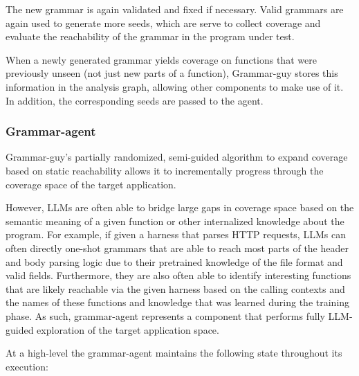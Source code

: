 The new grammar is again validated and fixed if necessary. Valid grammars are again used to generate more seeds, which are serve to collect coverage and evaluate the reachability of the grammar in the program under test.

When a newly generated grammar yields coverage on functions that were previously unseen (not just new parts of a function), Grammar-guy stores this information in the analysis graph, allowing other components to make use of it.
In addition, the corresponding seeds are passed to the \seedsync agent.

\subsubsection{Grammar-agent}

Grammar-guy's partially randomized, semi-guided algorithm to expand coverage based on static reachability allows it to incrementally progress through the coverage space of the target application.

However, LLMs are often able to bridge large gaps in coverage space based on the semantic meaning of a given function or other internalized knowledge about the program.
For example, if given a harness that parses HTTP requests, LLMs can often directly one-shot grammars that are able to reach most parts of the header and body parsing logic due to their pretrained knowledge of the file format and valid fields. Furthermore, they are also often able to identify interesting functions that are likely reachable via the given harness based on the calling contexts and the names of these functions and knowledge that was learned during the training phase.
As such, grammar-agent represents a component that performs fully LLM-guided exploration of the target application space.

        At a high-level the grammar-agent maintains the following state throughout its execution:
        
